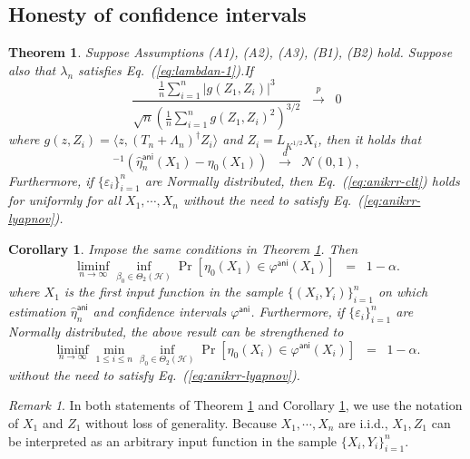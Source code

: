\documentclass[11pt,a4paper]{article}
\renewcommand{\hat}{\widehat}
\theoremstyle{definition}
\theoremstyle{plain}
\newtheorem{theorem}{Theorem}[section]
\newtheorem{corollary}{Corollary}[section]
\theoremstyle{remark}
\newtheorem{remark}{Remark}[section]
\newcommand{\mH}{\mathcal H}
\newcommand{\ani}{\mathsf{ani}}
\begin{document}
\subsection{Honesty of confidence intervals}

\begin{theorem}
Suppose Assumptions (A1), (A2), (A3), (B1), (B2) hold. Suppose also that $\lambda_n$ satisfies Eq.~(\ref{eq:lambdan-1}).If 
\begin{equation}
\frac{\frac{1}{n}\sum_{i=1}^n |g(Z_1,Z_i)|^3}{\sqrt{n}(\frac{1}{n}\sum_{i=1}^n g(Z_1,Z_i)^2)^{3/2}}\;\;\overset{p}{\to}\;\; 0
\label{eq:anikrr-lyapnov}
\end{equation}
where $g(z,Z_i)=\langle z,(T_n+\Lambda_n)^{\dagger}Z_i\rangle$ and $Z_i=L_{K^{1/2}}X_i$, then it holds that
\begin{equation}
[\hat\sigma_n^\ani(Z_1)]^{-1}(\hat\eta_n^\ani(X_1)-\eta_0(X_1)) \;\;\overset{d}{\to}\;\;\mathcal N(0,1),
\label{eq:anikrr-clt}
\end{equation}
Furthermore, if $\{\varepsilon_i\}_{i=1}^n$ are Normally distributed, then Eq.~(\ref{eq:anikrr-clt}) holds for \emph{uniformly} for all $X_1,\cdots,X_n$ without the need to satisfy Eq.~(\ref{eq:anikrr-lyapnov}).
\label{thm:anikrr-limiting}
\end{theorem}

\begin{corollary}
Impose the same conditions in Theorem \ref{thm:anikrr-limiting}. Then 
$$
\liminf_{n\to\infty}\inf_{\beta_0\in\Theta_2(\mH)}\Pr[\eta_0(X_1)\in\varphi^\ani(X_1)] \;\; = \;\; 1-\alpha.
$$
where $X_1$ is the first input function in the sample $\{(X_i,Y_i)\}_{i=1}^n$ on which estimation $\hat\eta_n^{\ani}$ and confidence intervals $\varphi^\ani$.
Furthermore, if $\{\varepsilon_i\}_{i=1}^n$ are Normally distributed, the above result can be strengthened to
$$
\liminf_{n\to\infty}\min_{1\leq i\leq n}\inf_{\beta_0\in\Theta_2(\mH)}\Pr[\eta_0(X_i)\in\varphi^\ani(X_i)] \;\; = \;\; 1-\alpha.
$$
without the need to satisfy Eq.~(\ref{eq:anikrr-lyapnov}).
\label{cor:anikrr-ci}
\end{corollary}

\begin{remark}
In both statements of Theorem \ref{thm:anikrr-limiting} and Corollary \ref{cor:anikrr-ci}, we use the notation of $X_1$ and $Z_1$ without loss of generality.
Because $X_1,\cdots,X_n$ are i.i.d., $X_1,Z_1$ can be interpreted as an arbitrary input function in the sample $\{X_i,Y_i\}_{i=1}^n$.
\end{remark}
\end{document}
